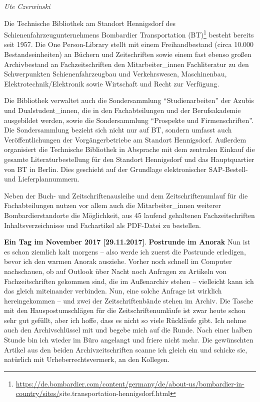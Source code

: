\documentclass[a4paper,
fontsize=11pt,
oneside,
numbers=noperiodatend,
parskip=half-,
bibliography=totoc,
final
]{scrartcl}
\begin{document}
\emph{Ute Czerwinski}

Die Technische Bibliothek am Standort Hennigsdorf des
Schienenfahrzeugunternehmens Bombardier Transportation (BT)\footnote{\url{https://de.bombardier.com/content/germany/de/about-us/bombardier-in-country/sites/}site.transportation-hennigsdorf.html}
besteht bereits seit 1957. Die One Person-Library stellt mit einem
Freihandbestand (circa 10.000 Bestandseinheiten) an Büchern und
Zeitschriften sowie einem fast ebenso großen Archivbestand an
Fachzeitschriften den Mitarbeiter\_innen Fachliteratur zu den
Schwerpunkten Schienenfahrzeugbau und Verkehrswesen, Maschinenbau,
Elektrotechnik/Elektronik sowie Wirtschaft und Recht zur Verfügung.

Die Bibliothek verwaltet auch die Sondersammlung
\enquote{Studienarbeiten} der Azubis und Dualstudent\_innen, die in den
Fachabteilungen und der Berufsakademie ausgebildet werden, sowie die
Sondersammlung \enquote{Prospekte und Firmenschriften}. Die
Sondersammlung bezieht sich nicht nur auf BT, sondern umfasst auch
Veröffentlichungen der Vorgängerbetriebe am Standort Hennigsdorf.
Außerdem organisiert die Technische Bibliothek in Absprache mit dem
zentralen Einkauf die gesamte Literaturbestellung für den Standort
Hennigsdorf und das Hauptquartier von BT in Berlin. Dies geschieht auf
der Grundlage elektronischer SAP-Bestell- und Lieferplannummern.

Neben der Buch- und Zeitschriftenausleihe und dem Zeitschriftenumlauf
für die Fachabteilungen nutzen vor allem auch die Mitarbeiter\_innen
weiterer Bombardierstandorte die Möglichkeit, aus 45 laufend gehaltenen
Fachzeitschriften Inhaltsverzeichnisse und Fachartikel als PDF-Datei zu
bestellen.

\textbf{Ein Tag im November 2017 {[}29.11.2017{]}}. \textbf{Postrunde im
Anorak} Nun ist es schon ziemlich kalt morgens -- also werde ich zuerst
die Postrunde erledigen, bevor ich den warmen Anorak ausziehe. Vorher
noch schnell im Computer nachschauen, ob auf Outlook über Nacht noch
Anfragen zu Artikeln von Fachzeitschriften gekommen sind, die im
Außenarchiv stehen -- vielleicht kann ich das gleich miteinander
verbinden. Nun, eine solche Anfrage ist wirklich hereingekommen -- und
zwei der Zeitschriftenbände stehen im Archiv. Die Tasche mit den
Hauspostumschlägen für die Zeitschriftenumläufe ist zwar heute schon
sehr gut gefüllt, aber ich hoffe, dass es nicht so viele Rückläufe gibt.
Ich nehme auch den Archivschlüssel mit und begebe mich auf die Runde.
Nach einer halben Stunde bin ich wieder im Büro angelangt und friere
nicht mehr. Die gewünschten Artikel aus den beiden Archivzeitschriften
scanne ich gleich ein und schicke sie, natürlich mit
Urheberrechtsvermerk, an den Kollegen.
\end{document}
